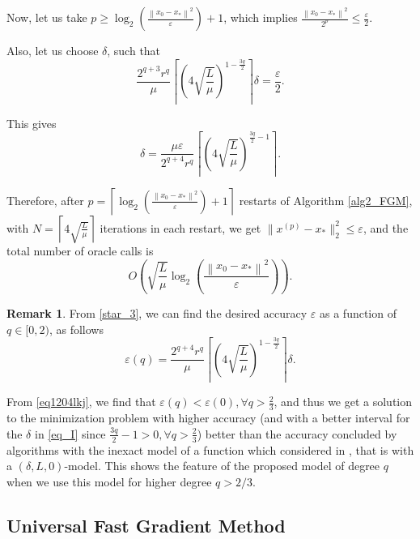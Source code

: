 \documentclass[11pt]{amsart}
\theoremstyle{definition}
\newtheorem{remark}[theorem]{Remark}
\numberwithin{equation}{section}
\begin{document}
Now, let us take $p \geq \log_2 \left(\frac{\left\|x_0 - x_*\right\|^2}{\varepsilon}\right) + 1 $, which implies $\frac{\left\|x_0 - x_*\right\|^2}{2^p} \leq \frac{\varepsilon}{2}$.

Also, let us choose $\delta$, such that 
\begin{equation}\label{star_3}
    \frac{2^{q+3} r^q}{\mu} \left\lceil\left( 4 \sqrt{\frac{L}{\mu}}\right)^{1- \frac{3q}{2}} \right\rceil \delta = \frac{\varepsilon}{2}. 
\end{equation}

This gives 
\begin{equation}\label{eq_I}
    \delta = \frac{\mu \varepsilon}{2^{q+4} r^q} \left\lceil\left( 4 \sqrt{\frac{L}{\mu}}\right)^{ \frac{3q}{2} - 1 } \right\rceil.  
\end{equation}

Therefore, after $p = \left \lceil \log_2 \left(\frac{\left\|x_0 - x_*\right\|^2}{\varepsilon}\right) + 1 \right\rceil $ restarts of Algorithm \ref{alg2_FGM}, with $N =  \left \lceil4 \sqrt{\frac{L}{\mu}} \right\rceil$ iterations in each restart, we get $\|x^{(p)} - x_*\|_2^2 \leq \varepsilon$, and the total number of oracle calls is 
\[
    O\left( \sqrt{\frac{L}{\mu}} \log_2 \left(\frac{\left\|x_0 - x_*\right\|^2}{\varepsilon}\right) \right) . 
\]

\begin{remark}
From \eqref{star_3}, we can find the desired accuracy $\varepsilon$ as a function of $q \in [0, 2)$, as follows
\begin{equation}\label{eq1204lkj}
    \varepsilon(q) = \frac{2^{q+4} r^q}{\mu} \left\lceil\left( 4 \sqrt{\frac{L}{\mu}}\right)^{1- \frac{3q}{2}} \right\rceil \delta.
\end{equation}

From \eqref{eq1204lkj}, we find that $\varepsilon(q) < \varepsilon(0), \forall q > \frac{2}{3}$, and thus we get a solution to the minimization problem with higher accuracy (and with a better interval for the $\delta$ in \eqref{eq_I} since $\frac{3q}{2} - 1 > 0, \forall q > \frac{2}{3}$) better than the accuracy concluded by algorithms with the inexact model of a function which considered in \cite{Gasnikov2019fast,Stonyakin2021OMS}, that is with a $(\delta, L, 0)$-model. This shows the feature of the proposed model of degree $q$ when we use this model for higher degree $q > 2/3$. 
\end{remark}


\subsection{Universal Fast Gradient Method}\label{subsect:Universal_mothod}
\end{document}
